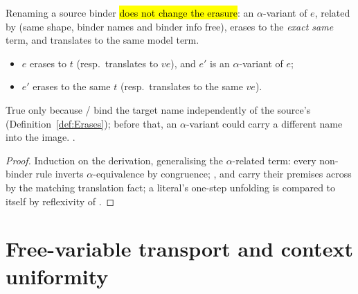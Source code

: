 \begin{theorem}
\label{thm:Erases-alpha}
\leanok
{}
 Renaming a source binder \hl{does not change the erasure}: an
$\alpha$-variant of $e$, related by  (same shape, binder names and
binder info free), erases to the \emph{exact same} \lbox{} term, and translates to the same
model term.
\begin{itemize}
\item {} $e$ erases to $t$ (resp.\ translates to $\mathit{ve}$), and $e'$ is an
$\alpha$-variant of $e$;
\item {} $e'$ erases to the same $t$ (resp.\ translates to the same $\mathit{ve}$).
\end{itemize}
 True only because / bind the target name independently of the
source's (Definition~\ref{def:Erases}); before that, an $\alpha$-variant could carry a
different name into the image.
 \stProved{}.
\end{theorem}
\begin{proof}
\leanok
{}
 Induction on the derivation, generalising the $\alpha$-related term: every
non-binder rule inverts $\alpha$-equivalence by congruence; ,  and
 carry their  premises across by the matching translation fact; a
literal's one-step unfolding is compared to itself by reflexivity of .
\end{proof}

\section{Free-variable transport and context uniformity}
\label{sec:erases:strengthen}

